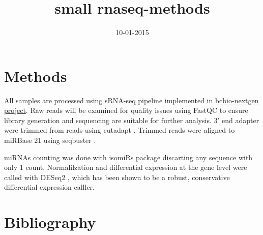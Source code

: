 \documentclass[11pt]{article}
\date{10-01-2015}
\title{small rnaseq-methods}
\begin{document}
\maketitle

\section{Methods}

All samples are processed using sRNA-seq pipeline implemented in
\href{http://bcbio-nextgen.readthedocs.org/en/latest/}{bcbio-nextgen project}.
Raw reads will be examined for quality
issues using FastQC to ensure library generation and sequencing are
suitable for further analysis. 3' end adapter were trimmed from reads using
cutadapt \cite{Martin:2011va}. Trimmed reads were aligned to miRBase
21 \cite{Kozomara2014} using seqbuster \cite{Pantano2010}.

miRNAs counting was done with isomiRs package \href{http://github.com/lpantano/isomiRs} discarting any sequence with only 1 count. Normalilzation and differential expression at the gene level were called with
DESeq2 \cite{Love:2014do}, which has been shown to be a robust,
conservative differential expression calller.

\section{Bibliography}


\end{document}
